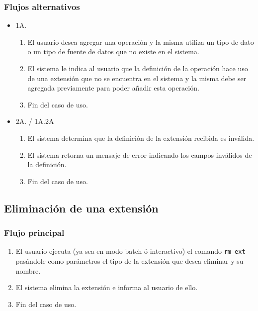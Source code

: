 \subsubsection*{Flujos alternativos}
\begin{itemize}
\item 1A.
    \begin{enumerate}
    \item El usuario desea agregar una operación y la misma utiliza un tipo de dato o un tipo de fuente de datos que no existe en el sistema.
    \item El sistema le indica al usuario que la definición de la operación hace uso de una extensión que no se encuentra en el sistema y la misma debe ser agregada previamente para poder añadir esta operación.
    \item Fin del caso de uso.
    \end{enumerate}
    
\item 2A. / 1A.2A
    \begin{enumerate}
    \item El sistema determina que la definición de la extensión recibida es inválida.
    \item El sistema retorna un mensaje de error indicando los campos inválidos de la definición.
    \item Fin del caso de uso.
    \end{enumerate}
\end{itemize}

\subsection{Eliminación de una extensión}

\subsubsection*{Flujo principal}
\begin{enumerate}
\item El usuario ejecuta (ya sea en modo batch ó interactivo) el comando \texttt{rm\_ext} pasándole como parámetros el tipo de la extensión que desea eliminar y su nombre.
\item El sistema elimina la extensión e informa al usuario de ello.
\item Fin del caso de uso.
\end{enumerate}


